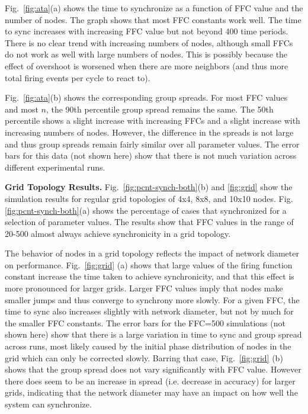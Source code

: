 Fig.~\ref{fig:ata}(a) shows the time to synchronize as a function of
FFC value and the number of nodes. The graph shows that most FFC
constants work well. The time to sync increases with increasing FFC
value but not beyond 400 time periods. There is no clear trend with
increasing numbers of nodes, although small FFCs do not work as well
with large numbers of nodes. This is possibly because the effect of
overshoot is worsened when there are more neighbors (and thus more
total firing events per cycle to react to).

Fig.~\ref{fig:ata}(b) shows the corresponding group spreads. For most
FFC values and most $n$, the 90th percentile group spread remains the
same. The 50th percentile shows a slight increase with increasing FFCs
and a slight increase with increasing numbers of nodes. However, the
difference in the spreads is not large and thus group spreads remain
fairly similar over all parameter values. The error bars for this data
(not shown here) show that there is not much variation across
different experimental runs.

{\bf Grid Topology Results.}  Fig.~\ref{fig:pcnt-synch-both}(b) and
\ref{fig:grid} show the simulation results for regular grid topologies
of 4x4, 8x8, and 10x10 nodes. Fig. \ref{fig:pcnt-synch-both}(a) shows
the percentage of cases that synchronized for a selection of parameter
values. The results show that FFC values in the range of 20-500 almost
always achieve synchronicity in a grid topology.

The behavior of nodes in a grid topology reflects the impact of
network diameter on performance. Fig.~\ref{fig:grid} (a) shows that
large values of the firing function constant increase the time taken
to achieve synchronicity, and that this effect is more pronounced for
larger grids. Larger FFC values imply that nodes make smaller jumps
and thus converge to synchrony more slowly. For a given FFC, the time
to sync also increases slightly with network diameter, but not by much
for the smaller FFC constants. The error bars for the FFC=500
simulations (not shown here) show that there is a large variation in
time to sync and group spread across runs, most likely caused by the
initial phase distribution of nodes in the grid which can only be
corrected slowly. Barring that case, Fig.~\ref{fig:grid} (b) shows
that the group spread does not vary significantly with FFC
value. However there does seem to be an increase in spread
(i.e. decrease in accuracy) for larger grids, indicating that the
network diameter may have an impact on how well the system can
synchronize.



